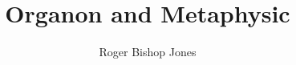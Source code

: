 


\usepackage[mathletters]{ucs}
\usepackage[utf8x]{inputenc}

\usepackage{fancyhdr}
\pagestyle{fancyplain}


\makeatletter
\def\cleardoublepage{\clearpage\if@twoside \ifodd\c@page\else
\hbox{}
\vspace*{\fill}
\begin{center}
\end{center}
\vspace{\fill}
\thispagestyle{empty}
\newpage
\if@twocolumn\hbox{}\newpage\fi\fi\fi}
\makeatother

\fancyhfoffset[EL,RO]{0pt}
\lhead[\fancyplain{}{\thepage}]         {\fancyplain{}{}}
\chead[\fancyplain{}{\slshape\leftmark}]                 {\fancyplain{}{\slshape\rightmark}}
\rhead[\fancyplain{}{}]       {\fancyplain{}{\thepage}}
\lfoot[\fancyplain{}{}]       {\fancyplain{}{}}
\cfoot[\fancyplain{}{}]       {\fancyplain{}{}}
\rfoot[\fancyplain{}{}]       {\fancyplain{}{}}

\renewcommand{\headrulewidth}{0pt}

\usepackage[twoside,paperwidth=5.25in,paperheight=8in,hmargin={0.75in,0.5in},vmargin={0.5in,0.5in},includehead,includefoot]{geometry}
\usepackage{tocloft}
\usepackage{tocbibind}

\makeindex

\newcommand{\indexentry}[2]{\item #1 #2}

\newcommand{\ignore}[1]{}

\title{Organon and Metaphysic}
\author{Roger Bishop Jones}
\date{\ }



\frontmatter

